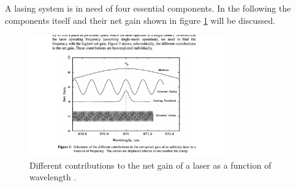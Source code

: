 \noindent
A lasing system is in need of four essential components.
In the following the components itself and their net gain shown in figure \ref{fig:netgain} will be discussed.

\begin{figure}
  \centering
  \includegraphics[width=0.75\textwidth]{net_gain.pdf}
  \caption{Different contributions to the net gain of a laser as a function of wavelength \cite{V60}.}
  \label{fig:netgain}
\end{figure}

